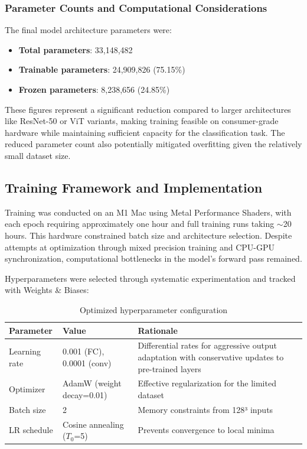 \documentclass[12pt, a4paper]{article}
\begin{document}
\subsubsection{Parameter Counts and Computational Considerations}

The final model architecture parameters were:

\begin{itemize}
    \item \textbf{Total parameters}: 33,148,482
    \item \textbf{Trainable parameters}: 24,909,826 (75.15\%)
    \item \textbf{Frozen parameters}: 8,238,656 (24.85\%)
\end{itemize}

These figures represent a significant reduction compared to larger architectures like ResNet-50 or ViT variants, making training feasible on consumer-grade hardware while maintaining sufficient capacity for the classification task. The reduced parameter count also potentially mitigated overfitting given the relatively small dataset size.

\subsection{Training Framework and Implementation}

Training was conducted on an M1 Mac using Metal Performance Shaders, with each epoch requiring approximately one hour and full training runs taking $\sim$20 hours. This hardware constrained batch size and architecture selection. Despite attempts at optimization through mixed precision training and CPU-GPU synchronization, computational bottlenecks in the model's forward pass remained.

Hyperparameters were selected through systematic experimentation and tracked with Weights \& Biases:

\begin{table}[htbp]
\centering
\begin{tabular}{|l|l|p{5.5cm}|}
\hline
\textbf{Parameter} & \textbf{Value} & \textbf{Rationale} \\
\hline
Learning rate & 0.001 (FC), 0.0001 (conv) & Differential rates for aggressive output adaptation with conservative updates to pre-trained layers \\
\hline
Optimizer & AdamW (weight decay=0.01) & Effective regularization for the limited dataset \\
\hline
Batch size & 2 & Memory constraints from 128³ inputs \\
\hline
LR schedule & Cosine annealing ($T_0$=5) & Prevents convergence to local minima \\
\hline
\end{tabular}
\caption{Optimized hyperparameter configuration}
\end{table}
\end{document}

